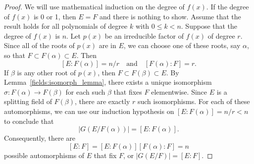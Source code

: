 \begin{proof}
We will use mathematical induction on the degree of $f(x)$.  If the degree of $f(x)$ is 0 or 1, then $E = F$ and there is nothing to show.  Assume
that the result holds for all polynomials of degree $k$ with $0 \leq k < n$.  Suppose that the degree of $f(x)$ is $n$.  Let $p(x)$ be an irreducible factor of $f(x)$ of degree $r$.  Since all of the roots of $p(x)$ are in $E$, we can choose one of these roots, say $\alpha$, so that $F \subset F( \alpha ) \subset E$.  Then
\[
[E: F(\alpha)] = n/r \quad \text{and} \quad [F(\alpha): F] = r.
\]
If $\beta$ is any other root of $p(x)$, then $F \subset F( \beta ) \subset E$.  By Lemma~\ref{fields:isomorph_lemma}, there exists a unique isomorphism $\sigma: F( \alpha ) \rightarrow F( \beta )$ for each such $\beta$ that fixes $F$ elementwise.  Since $E$ is a splitting field of $F(\beta)$, there are exactly $r$ such isomorphisms.  For each of these automorphisms, we can use our induction hypothesis on $[E: F(\alpha)] = n/r < n$ to conclude that
\[
|G(E/F(\alpha))| = [E:F(\alpha)].
\]
Consequently, there are
\[
[E:F] = [E:F(\alpha)] [F( \alpha):F] = n
\]
possible automorphisms of $E$ that fix $F$, or $|G(E/F)| = [E:F]$.

%
%
\end{proof}

